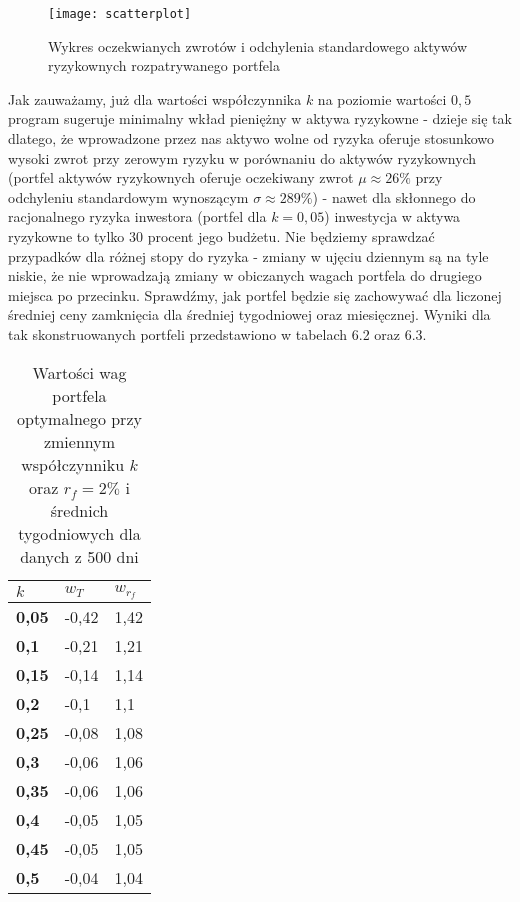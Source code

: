 \documentclass[magister]{dyplom}
\begin{document}
\begin{figure}[ht]
	\centering
	\texttt{[image: scatterplot]}
	\caption{Wykres oczekwianych zwrotów i odchylenia standardowego aktywów ryzykownych rozpatrywanego portfela}
\end{figure}
\newpage
Jak zauważamy, już dla wartości współczynnika $k$ na poziomie wartości $0,5$ program sugeruje minimalny wkład pieniężny w aktywa ryzykowne - dzieje się tak dlatego, że wprowadzone przez nas aktywo wolne od ryzyka oferuje stosunkowo wysoki zwrot przy zerowym ryzyku w porównaniu do aktywów ryzykownych (portfel aktywów ryzykownych oferuje oczekiwany zwrot $\mu \approx 26\%$ przy odchyleniu standardowym wynoszącym $\sigma \approx 289\%$) - nawet dla skłonnego do racjonalnego ryzyka inwestora (portfel dla $k = 0,05$) inwestycja w aktywa ryzykowne to tylko 30 procent jego budżetu. Nie będziemy sprawdzać przypadków dla różnej stopy do ryzyka - zmiany w ujęciu dziennym są na tyle niskie, że nie wprowadzają zmiany w obiczanych wagach portfela do drugiego miejsca po przecinku. Sprawdźmy, jak portfel będzie się zachowywać dla liczonej średniej ceny zamknięcia dla średniej tygodniowej oraz miesięcznej. Wyniki dla tak skonstruowanych portfeli przedstawiono w tabelach 6.2 oraz 6.3.
\begin{table}[ht]
	\centering
	\caption{Wartości wag portfela optymalnego przy zmiennym współczynniku $k$ oraz $r_f = 2\%$ i średnich tygodniowych dla danych z 500 dni}
	\begin{tabular}{|l|l|l|}
		\hline
		\textbf{$k$} & \textbf{$w_T$} & \textbf{$w_{r_f}$} \\ \hline
		\textbf{0,05}                                             & -0,42         & 1,42           \\ \hline
		\textbf{0,1}                                              & -0,21         & 1,21           \\ \hline
		\textbf{0,15}                                             & -0,14         & 1,14           \\ \hline
		\textbf{0,2}                                              & -0,1          & 1,1            \\ \hline
		\textbf{0,25}                                             & -0,08         & 1,08           \\ \hline
		\textbf{0,3}                                              & -0,06         & 1,06           \\ \hline
		\textbf{0,35}                                             & -0,06         & 1,06           \\ \hline
		\textbf{0,4}                                              & -0,05         & 1,05           \\ \hline
		\textbf{0,45}                                             & -0,05         & 1,05           \\ \hline
		\textbf{0,5}                                              & -0,04         & 1,04           \\ \hline
	\end{tabular}
\end{table}
\end{document}
